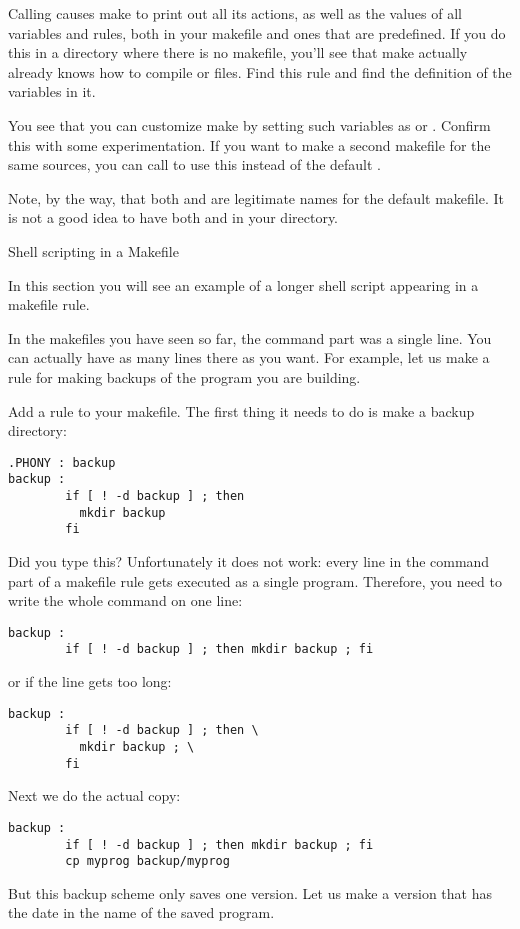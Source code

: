 Calling  causes make to print out all its
actions, as well as the values of all variables and rules, both in
your makefile and ones that are predefined. If you do this in a
directory where there is no makefile, you'll see that make actually
already knows how to compile  or  files. Find this rule
and find the definition of the variables in it.

You see that you can customize make by setting such variables as
 or . Confirm this with some experimentation. If
you want to make a second makefile for the same sources, you can call
 to use this instead of the default
.

Note, by the way, that both  and  are
legitimate names for the default makefile. It is not a good idea to
have both  and  in your directory.

 {Shell scripting in a Makefile}

\begin{purpose}
  In this section you will see an example of a longer shell script
  appearing in a makefile rule.
\end{purpose}

In the makefiles you have seen so far, the command part was a single
line. You can actually have as many lines there as you want.
For example, let us make a rule for making backups of the program you
are building.

Add a   rule to your makefile. The first thing it needs to
do is make a backup directory:
\begin{verbatim}
.PHONY : backup
backup :
        if [ ! -d backup ] ; then 
          mkdir backup
        fi
\end{verbatim}
Did you type this? Unfortunately it does not work: every line in the
command part of a makefile rule gets executed as a single
program. Therefore, you need to write the whole command on one line:
\begin{verbatim}
backup :
        if [ ! -d backup ] ; then mkdir backup ; fi
\end{verbatim}
or if the line gets too long:
\begin{verbatim}
backup :
        if [ ! -d backup ] ; then \
          mkdir backup ; \
        fi
\end{verbatim}
Next we do the actual copy:
\begin{verbatim}
backup :
        if [ ! -d backup ] ; then mkdir backup ; fi
        cp myprog backup/myprog
\end{verbatim}
But this backup scheme only saves one version. Let us make a version
that has the date in the name of the saved program. 

